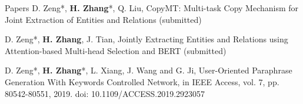 \documentclass{resume} %
\begin{document}
\begin{rSection}{Papers}
    D. Zeng*, \textbf{H. Zhang}*, Q. Liu, CopyMT: Multi-task Copy Mechanism for Joint Extraction of Entities and Relations (submitted)

    D. Zeng*, \textbf{H. Zhang}, J. Tian, Jointly Extracting Entities and Relations using Attention-based Multi-head Selection and BERT (submitted)

    D. Zeng*, \textbf{H. Zhang}*, L. Xiang, J. Wang and G. Ji, User-Oriented Paraphrase Generation With Keywords Controlled Network, in IEEE Access, vol. 7, pp. 80542-80551, 2019.     doi: 10.1109/ACCESS.2019.2923057
\end{rSection}


\newpage
\end{document}
